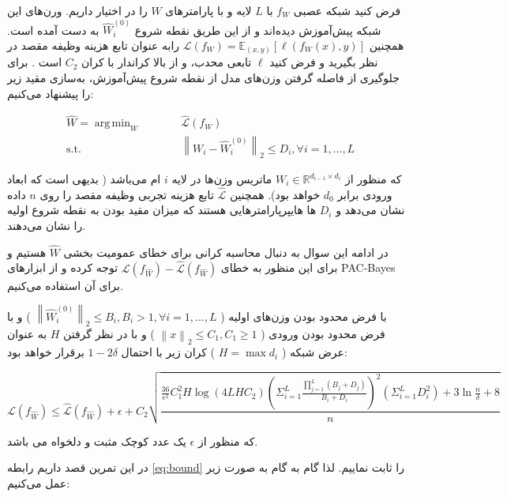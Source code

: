 \documentclass{article}
\DeclareMathOperator*{\argmin}{arg\,min}
\begin{document}
فرض کنید شبکه عصبی 
$f_W$
با
$L$
لایه و 
با پارامترهای 
$W$
را در اختیار داریم. 
ورن‌های این شبکه پیش‌آموزش دیده‌اند و از این طریق نقطه شروع 
$\hat{W}_i^{(0)}$
به دست آمده است.
همچنین 
$\mathcal{L}(f_W) = \mathbb{E}_{(x,y)}[\ell(f_W(x),y)]$
رابه عنوان تابع هزینه وظیفه مقصد در نظر بگیرید
و فرض کنید 
$\ell$
تابعی 
محدب،
و از بالا کراندار با کران 
$C_2$
است
.
برای جلوگیری از فاصله گرفتن وزن‌های مدل از نقطه شروع پیش‌آموزش،
 به‌سازی مقید زیر را پیشنهاد می‌کنیم:

\begin{subequations}
\begin{alignat}{2}
&\!\hat{W} = \argmin_{W}       &\qquad&  \mathcal{\hat{L}}(f_W)\\
&\text{s.t.} &      & {\left\lVert W_i - \hat{W}_i^{(0)}\right\rVert}_2 \leq D_i, \forall  i = 1,...,L
\end{alignat}
\end{subequations}

که منظور از 
$W_i \in \mathbb{R}^{d_{i-1} \times d_i}$
ماتریس وزن‌ها در لایه 
$i$
ام می‌باشد
(
بدیهی است که ابعاد ورودی برابر 
$d_0$
خواهد بود).
همچنین 
$\hat{\mathcal{L}}$
تابع هزینه تجربی وظیفه مقصد را روی 
$n$
داده
نشان می‌دهد و 
$D_i$
ها هایپرپارامترهایی هستند که میزان مقید بودن به نقطه شروع اولیه را نشان می‌دهند.

در ادامه این سوال به دنبال محاسبه کرانی برای خطای عمومیت بخشی 
$\hat{W}$
هستیم و برای این منظور 
به خطای 
$\mathcal{L}(f_{\hat{W}}) - \hat{\mathcal{L}}(f_{\hat{W}})$
توجه کرده و از ابزارهای 
PAC-Bayes
برای آن استفاده می‌کنیم.

با فرض محدود بودن وزن‌های اولیه
(
$
\left\lVert \hat{W}_i^{(0)} \right\rVert_2 \leq B_i , B_i > 1, \forall i = 1,...,L
$
) و 
با فرض 
محدود بودن ورودی
(
$
\left\lVert x \right\rVert_2 \leq C_1 , C_1 \geq 1
$
) و 
با در نظر گرفتن 
$H$
به عنوان عرض شبکه 
(
$H =\max d_i$
)
کران زیر با احتمال
$1 - 2\delta$
برقرار خواهد بود:



\begin{equation} \label{eq:bound}
    \mathcal{L}(f_{\hat{W}}) \leq \hat{\mathcal{L}}(f_{\hat{W}}) + \epsilon + C_2\sqrt{\frac{\frac{36}{\epsilon^2}C_1^{2}H\log{(4LHC_2)}(\Sigma^{L}_{i = 1}\frac{\prod^{L}_{j = 1}(B_j + D_j)}{B_i + D_i})^2(\Sigma^{L}_{i = 1}D_i^2) + 3\ln \frac{n}{\delta} + 8}{n}}
\end{equation}


که منظور از 
$\epsilon$
یک عدد کوچک  مثبت و دلخواه می باشد.

در این تمرین قصد داریم رابطه
\ref{eq:bound}
را ثابت نماییم.
لذا گام به گام به صورت زیر عمل می‌کنیم:
\end{document}
